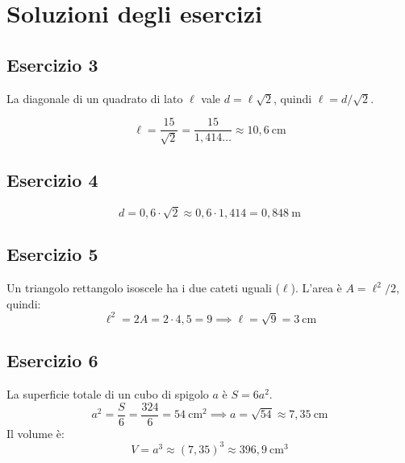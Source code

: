 \section{Soluzioni degli esercizi}

\subsection*{Esercizio 3}

La diagonale di un quadrato di lato \(\ell\) vale \(d = \ell\sqrt{2}\),
quindi \(\ell = d / \sqrt{2}\).

\[
    \ell = \frac{15}{\sqrt{2}} = \frac{15}{1{,}414\ldots} \approx 10{,}6\ \text{cm}
\]

\subsection*{Esercizio 4}

\[
    d = 0{,}6 \cdot \sqrt{2} \approx 0{,}6 \cdot 1{,}414 = 0{,}848\ \text{m}
\]

\subsection*{Esercizio 5}

Un triangolo rettangolo isoscele ha i due cateti uguali (\(\ell\)).
L'area è \(A = \ell^2 / 2\), quindi:
\[
    \ell^2 = 2A = 2 \cdot 4{,}5 = 9 \implies \ell = \sqrt{9} = 3\ \text{cm}
\]

\subsection*{Esercizio 6}

La superficie totale di un cubo di spigolo \(a\) è \(S = 6a^2\).
\[
    a^2 = \frac{S}{6} = \frac{324}{6} = 54\ \text{cm}^2
    \implies a = \sqrt{54} \approx 7{,}35\ \text{cm}
\]
Il volume è:
\[
    V = a^3 \approx (7{,}35)^3 \approx 396{,}9\ \text{cm}^3
\]